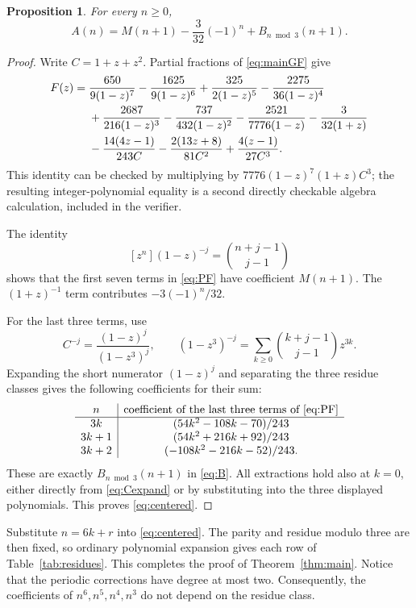 \documentclass[11pt]{article}
\numberwithin{equation}{section}
\newtheorem{proposition}[theorem]{Proposition}
\theoremstyle{definition}
\begin{document}
\begin{proposition}\label{prop:centered}
For every $n\geq0$,
\begin{equation}\label{eq:centered}
 \boxed{\displaystyle
 A(n)=M(n+1)-\frac{3}{32}(-1)^n+B_{n\bmod3}(n+1).}
\end{equation}
\end{proposition}

\begin{proof}
Write $C=1+z+z^2$. Partial fractions of \eqref{eq:mainGF} give
\begin{align}\label{eq:PF}
 F(z)={}&\frac{650}{9(1-z)^7}-\frac{1625}{9(1-z)^6}
       +\frac{325}{2(1-z)^5}-\frac{2275}{36(1-z)^4}\notag\\
 &+\frac{2687}{216(1-z)^3}-\frac{737}{432(1-z)^2}
       -\frac{2521}{7776(1-z)}-\frac{3}{32(1+z)}\notag\\
 &-\frac{14(4z-1)}{243C}
       -\frac{2(13z+8)}{81C^2}
       +\frac{4(z-1)}{27C^3}.
\end{align}
This identity can be checked by multiplying by
$7776(1-z)^7(1+z)C^3$; the resulting integer-polynomial equality is a
second directly checkable algebra calculation, included in the verifier.

The identity
\[
 [z^n](1-z)^{-j}=\binom{n+j-1}{j-1}
\]
shows that the first seven terms in \eqref{eq:PF} have coefficient $M(n+1)$.
The $(1+z)^{-1}$ term contributes $-3(-1)^n/32$.

For the last three terms, use
\begin{equation}\label{eq:Cexpand}
 C^{-j}=\frac{(1-z)^j}{(1-z^3)^j},\qquad
 (1-z^3)^{-j}=\sum_{k\geq0}\binom{k+j-1}{j-1}z^{3k}.
\end{equation}
Expanding the short numerator $(1-z)^j$ and separating the three residue
classes gives the following coefficients for their sum:
\[
\begin{array}{c|c}
n&\text{coefficient of the last three terms of \eqref{eq:PF}}\\ \hline
3k&(54k^2-108k-70)/243\\
3k+1&(54k^2+216k+92)/243\\
3k+2&(-108k^2-216k-52)/243.
\end{array}
\]
These are exactly $B_{n\bmod3}(n+1)$ in \eqref{eq:B}. All extractions hold
also at $k=0$, either directly from \eqref{eq:Cexpand} or by substituting
into the three displayed polynomials. This proves \eqref{eq:centered}.
\end{proof}

Substitute $n=6k+r$ into \eqref{eq:centered}. The parity and residue modulo
three are then fixed, so ordinary polynomial expansion gives each row of
Table~\ref{tab:residues}. This completes the proof of
Theorem~\ref{thm:main}. Notice that the periodic corrections have degree at
most two. Consequently, the coefficients of $n^6,n^5,n^4,n^3$ do not depend
on the residue class.
\end{document}
